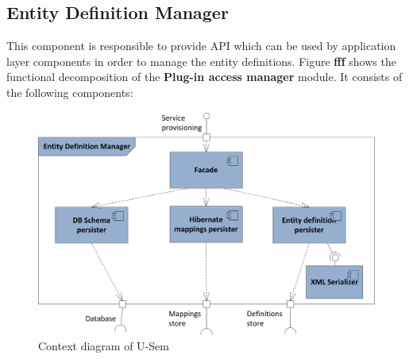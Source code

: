 \documentclass[a4paper, notitlepage]{article}
\begin{document}
\subsection{Entity Definition Manager}
This component is responsible to provide API which can be used by application layer components in order to manage the entity definitions. Figure \textbf{fff} shows the functional decomposition of the \textbf{Plug-in access manager} module. It consists of the following components:

\begin{figure}[h!]
  \centering
  	\includegraphics[scale=0.7]{functional/func_access.png}
  \caption{Context diagram of U-Sem }
  \label{fig_context}
\end{figure}
\end{document}
